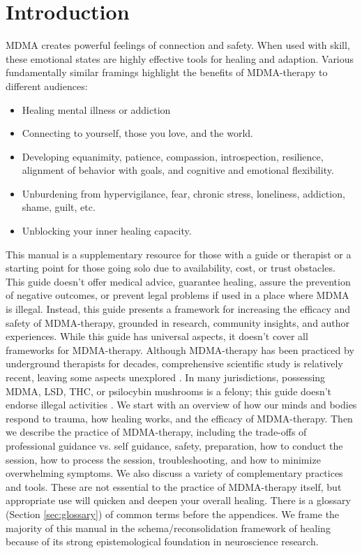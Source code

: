 \documentclass[12pt,letterpaper]{article}
\begin{document}
\section{Introduction}
MDMA creates powerful feelings of connection and safety. When used with skill, these emotional states are highly effective tools for healing and adaption. Various fundamentally similar framings highlight the benefits of MDMA-therapy to different audiences:
\begin{itemize}
    \item Healing mental illness or addiction
    \item Connecting to yourself, those you love, and the world.
    \item Developing equanimity, patience, compassion, introspection, resilience, alignment of behavior with goals, and cognitive and emotional flexibility.
    \item Unburdening from hypervigilance, fear, chronic stress, loneliness, addiction, shame, guilt, etc.
    \item Unblocking your inner healing capacity.
\end{itemize}
This manual is a supplementary resource for those with a guide or therapist or a starting point for those going solo due to availability, cost, or trust obstacles. This guide doesn't offer medical advice, guarantee healing, assure the prevention of negative outcomes, or prevent legal problems if used in a place where MDMA is illegal. Instead, this guide presents a framework for increasing the efficacy and safety of MDMA-therapy, grounded in research, community insights, and author experiences. While this guide has universal aspects, it doesn't cover all frameworks for MDMA-therapy. Although MDMA-therapy has been practiced by underground therapists for decades, comprehensive scientific study is relatively recent, leaving some aspects unexplored \cite{passieHistory}. In many jurisdictions, possessing MDMA, LSD, THC, or psilocybin mushrooms is a felony; this guide doesn't endorse illegal activities \cite{alphaLegalization}.
We start with an overview of how our minds and bodies respond to trauma, how healing works, and the efficacy of MDMA-therapy. Then we describe the practice of MDMA-therapy, including the trade-offs of professional guidance vs. self guidance, safety, preparation, how to conduct the session, how to process the session, troubleshooting, and how to minimize overwhelming symptoms. We also discuss a variety of complementary practices and tools. These are not essential to the practice of MDMA-therapy itself, but appropriate use will quicken and deepen your overall healing. There is a glossary (Section \ref{sec:glossary}) of common terms before the appendices. We frame the majority of this manual in the schema/reconsolidation framework of healing because of its strong epistemological foundation in neuroscience research.
\end{document}
